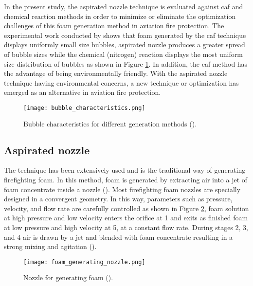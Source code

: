 In the present study, the aspirated nozzle technique is evaluated against \acrshort{caf} and chemical reaction methods in order to minimize or eliminate the optimization challenges of this foam generation method in aviation fire protection. The experimental work conducted by \cite{laundess2012suppression} shows that foam generated by the \acrshort{caf} technique displays uniformly small size bubbles, aspirated nozzle produces a greater spread of bubble sizes while the chemical (nitrogen) reaction displays the most uniform size distribution of bubbles as shown in Figure \ref{ch2:figure:characteristics}. In addition, the \acrshort{caf} method has the advantage of being environmentally friendly.  With the aspirated nozzle technique having environmental concerns, a new technique or optimization has emerged as an alternative in aviation fire protection. 

\begin{figure}[H]
    \centering
    \texttt{[image: bubble\_characteristics.png]}
    \caption{Bubble characteristics for different generation methods (\cite{laundess2012suppression}).}
    \label{ch2:figure:characteristics}
\end{figure}

\subsection{Aspirated nozzle}
The technique has been extensively used and is the traditional way of generating firefighting foam. In this method, foam is generated by extracting air into a jet of foam concentrate inside a nozzle (\cite{xi2017experimental}). Most firefighting foam nozzles are specially designed in a convergent geometry. In this way, parameters such as pressure, velocity, and flow rate are carefully controlled as shown in Figure \ref{ch2:figure:nozzle}, foam solution at high pressure and low velocity enters the orifice at 1 and exits as finished foam at low pressure and high velocity at 5, at a constant flow rate. During stages 2, 3, and 4 air is drawn by a jet and blended with foam concentrate resulting in a strong mixing and agitation (\cite{csb2016phenomenological}).

\begin{figure}[H]
    \centering
    \texttt{[image: foam\_generating\_nozzle.png]}
    \caption{Nozzle for generating foam (\cite{csb2016phenomenological}).}
    \label{ch2:figure:nozzle}
\end{figure}

